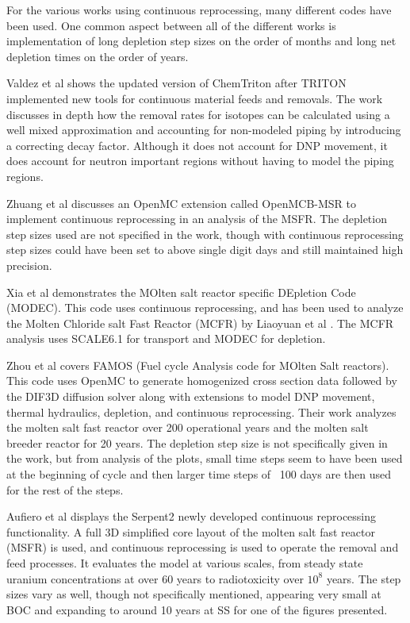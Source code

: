 For the various works using continuous reprocessing, many different codes have been used. One common aspect between all of the different works is implementation of long depletion step sizes on the order of months and long net depletion times on the order of years.

Valdez et al \cite{jr_vicente_valdez_modeling_2020} shows the updated version of ChemTriton after TRITON implemented new tools for continuous material feeds and removals. The work discusses in depth how the removal rates for isotopes can be calculated using a well mixed approximation and accounting for non-modeled piping by introducing a correcting decay factor. Although it does not account for DNP movement, it does account for neutron important regions without having to model the piping regions.

Zhuang et al \cite{zhuang_extended_2020} discusses an OpenMC extension called OpenMCB-MSR to implement continuous reprocessing in an analysis of the MSFR. The depletion step sizes used are not specified in the work, though with continuous reprocessing step sizes could have been set to above single digit days and still maintained high precision.

Xia et al \cite{xia_development_2019} demonstrates the MOlten salt reactor specific DEpletion Code (MODEC). This code uses continuous reprocessing, and has been used to analyze the Molten Chloride salt Fast Reactor (MCFR) by Liaoyuan et al \cite{liaoyuan_th-u_2021}. The MCFR analysis uses SCALE6.1 for transport and MODEC for depletion. 

Zhou et al \cite{zhou_fuel_2018} covers FAMOS (Fuel cycle Analysis code for MOlten Salt reactors). This code uses OpenMC to generate homogenized cross section data followed by the DIF3D diffusion solver along with extensions to model DNP movement, thermal hydraulics, depletion, and continuous reprocessing. Their work  analyzes the molten salt fast reactor over 200 operational years and the molten salt breeder reactor for 20 years. The depletion step size is not specifically given in the work, but from analysis of the plots, small time steps seem to have been used at the beginning of cycle and then larger time steps of ~100 days are then used for the rest of the steps.

Aufiero et al \cite{aufiero_extended_2013} displays the Serpent2 newly developed continuous reprocessing functionality. A full 3D simplified core layout of the molten salt fast reactor (MSFR) is used, and continuous reprocessing is used to operate the removal and feed processes. It evaluates the model at various scales, from steady state uranium concentrations at over 60 years to radiotoxicity over $10^8$ years. The step sizes vary as well, though not specifically mentioned, appearing very small at BOC and expanding to around 10 years at SS for one of the figures presented.

